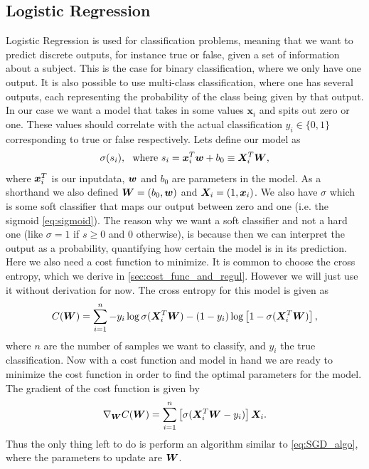 \documentclass[12pt]{extarticle}
\begin{document}
\subsection{Logistic Regression}\label{sec:logistic_regression}
Logistic Regression is used for classification problems, meaning that we want to predict discrete outputs, for instance true or false, given a set of information about a subject. This is the case for binary classification, where we only have one output. It is also possible to use multi-class classification, where one has several outputs, each representing the probability of the class being given by that output. In our case we want a model that takes in some values $\mathbf{x}_i$ and spits out zero or one. These values should correlate with the actual classification $y_i\in\{0,1\}$ corresponding to true or false respectively. Lets define our model as
\begin{align}
	\sigma(s_i), \ \ \text{where }s_i = \boldsymbol x_i^T \boldsymbol w + b_0 \equiv \boldsymbol X_i^T \boldsymbol W,
	\label{eq:log_reg_model}
\end{align}
where $\boldsymbol x_i^T$ is our inputdata, $\boldsymbol w$ and $b_0$ are parameters in the model. As a shorthand we also defined $\boldsymbol W = (b_0, \boldsymbol w)$ and $\boldsymbol X_i = (1, \boldsymbol x_i)$. We also have $\sigma$ which is some soft classifier that maps our output between zero and one (i.e. the sigmoid \eqref{eq:sigmoid}). The reason why we want a soft classifier and not a hard one (like $\sigma = 1$ if $s\geq0$ and $0$ otherwise), is because then we can interpret the output as a probability, quantifying how certain the model is in its prediction. Here we also need a cost function to minimize. It is common to choose the cross entropy, which we derive in \ref{sec:cost_func_and_regul}. However we will just use it without derivation for now. The cross entropy for this model is given as
\begin{align}
	C(\boldsymbol W) = \sum_{i = 1}^{n} -y_i \log\sigma(\boldsymbol X_i^T \boldsymbol W) - (1 - y_i)\log\left[1 - \sigma(\boldsymbol X^T_i \boldsymbol W)\right],
	\label{eq:cross_entropy2}
\end{align}
where $n$ are the number of samples we want to classify, and $y_i$ the true classification. Now with a cost function and model in hand we are ready to minimize the cost function in order to find the optimal parameters for the model. The gradient of the cost function is given by
\begin{align}
	\nabla_{\boldsymbol W} C(\boldsymbol W) = \sum_{i = 1}^n \left[\sigma(\boldsymbol X_i^T \boldsymbol W - y_i)\right]\boldsymbol X_i.
	\label{eq:cross_entropy_grad}
\end{align}
Thus the only thing left to do is perform an algorithm similar to \ref{eq:SGD_algo}, where the parameters to update are $\boldsymbol W$.
\end{document}
